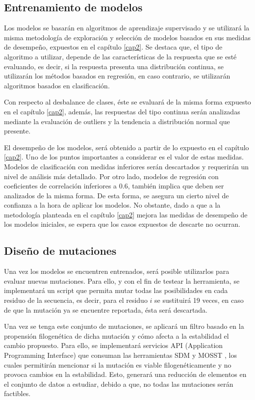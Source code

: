 \subsection{Entrenamiento de modelos}

Los modelos se basarán en algoritmos de aprendizaje supervisado y se utilizará la misma metodología de exploración y selección de modelos basados en sus medidas de desempeño, expuestos en el capítulo \ref{cap2}. Se destaca que, el tipo de algoritmo a utilizar, depende de las características de la respuesta que se esté evaluando, es decir, si la respuesta presenta una distribución continua, se utilizarán los métodos basados en regresión, en caso contrario, se utilizarán algoritmos basados en clasificación.

Con respecto al desbalance de clases, éste se evaluará de la misma forma expuesto en el capítulo \ref{cap2}, además, las respuestas del tipo continua serán analizadas mediante la evaluación de outliers y la tendencia a distribución normal que presente.

El desempeño de los modelos, será obtenido a partir de lo expuesto en el capítulo \ref{cap2}. Uno de los puntos importantes a considerar es el valor de estas medidas. Modelos de clasificación con medidas inferiores serán descartados y requerirán un nivel de análisis más detallado. Por otro lado, modelos de regresión con coeficientes de correlación inferiores a 0.6, también implica que deben ser analizados de la misma forma. De esta forma, se asegura un cierto nivel de confianza a la hora de aplicar los modelos. No obstante, dado a que a la metodología planteada en el capítulo \ref{cap2} mejora las medidas de desempeño de los modelos iniciales, se espera que los casos expuestos de descarte no ocurran.

\subsection{Diseño de mutaciones}

Una vez los modelos se encuentren entrenados, será posible utilizarlos para evaluar nuevas mutaciones. Para ello, y con el fin de testear la herramienta, se implementará un script que permita mutar todas las posibilidades en cada residuo de la secuencia, es decir, para el residuo $i$ se sustituirá 19 veces, en caso de que la mutación ya se encuentre reportada, ésta será descartada. 

Una vez se tenga este conjunto de mutaciones, se aplicará un filtro basado en la propensión filogenética de dicha mutación y cómo afecta a la estabilidad el cambio propuesto. Para ello, se implementará servicios API (Application Programming Interface) que consuman las herramientas SDM \cite{Pandurangan2017} y MOSST \cite{Olivera-Nappa2011}, los cuales permitirán mencionar si la mutación es viable filogenéticamente y no provoca cambios en la estabilidad. Esto, generará una reducción de elementos en el conjunto de datos a estudiar, debido a que, no todas las mutaciones serán factibles. 

